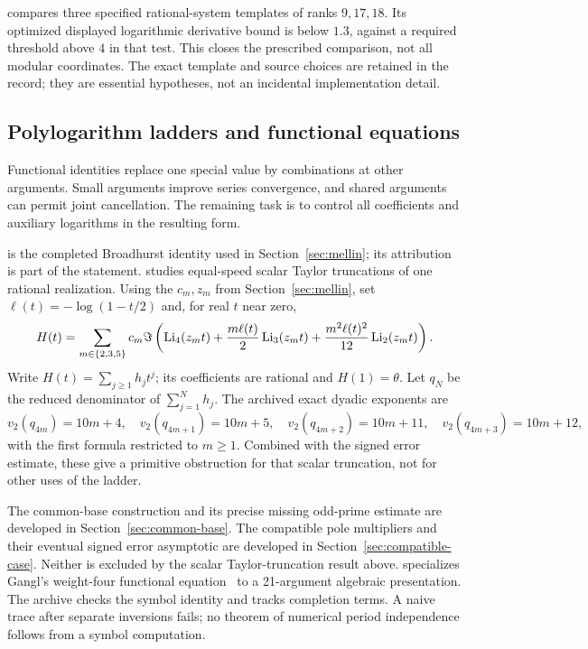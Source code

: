  compares three specified rational-system templates of ranks
$9,17,18$. Its optimized displayed logarithmic derivative bound is
below $1.3$, against a required threshold above $4$ in that test.
This closes the prescribed comparison, not all modular coordinates.
The exact template and source choices are retained in the record;
they are essential hypotheses, not an incidental implementation detail.

\subsection{Polylogarithm ladders and functional equations}
Functional identities replace one special value by combinations at
other arguments. Small arguments improve series convergence, and shared
arguments can permit joint cancellation. The remaining task is to
control all coefficients and auxiliary logarithms in the resulting form.

 is the completed Broadhurst identity used in
Section~\ref{sec:mellin}; its attribution is part of the statement.
 studies equal-speed scalar Taylor truncations of one rational
realization. Using the $c_m,z_m$ from Section~\ref{sec:mellin}, set
$\ell(t)=-\log(1-t/2)$ and, for real $t$ near zero,
\[
 H(t)=\sum_{m\in\{2,3,5\}}c_m\Im\left(
 \operatorname{Li}_4(z_mt)+\frac{m\ell(t)}2\operatorname{Li}_3(z_mt)
                  +\frac{m^2\ell(t)^2}{12}\operatorname{Li}_2(z_mt)\right).
\]
Write $H(t)=\sum_{j\geq1}h_jt^j$; its coefficients are rational
and $H(1)=\theta$. Let $q_N$ be the reduced denominator of
$\sum_{j=1}^N h_j$. The archived exact
dyadic exponents are
\[
 v_2(q_{4m})=10m+4,\quad v_2(q_{4m+1})=10m+5,\quad
 v_2(q_{4m+2})=10m+11,\quad v_2(q_{4m+3})=10m+12,
\]
with the first formula restricted to $m\geq1$. Combined with the
signed error estimate, these give a primitive obstruction for that
scalar truncation, not for other uses of the ladder.

The common-base construction  and its precise missing
odd-prime estimate are developed in Section~\ref{sec:common-base}.
The compatible pole multipliers  and their eventual signed
error asymptotic are developed in Section~\ref{sec:compatible-case}.
Neither is excluded by the scalar Taylor-truncation result above.
 specializes Gangl's weight-four functional equation~\cite{Gangl}
to a 21-argument algebraic presentation. The archive checks the symbol
identity and tracks completion terms. A naive trace after separate
inversions fails; no theorem of numerical period independence follows
from a symbol computation.

